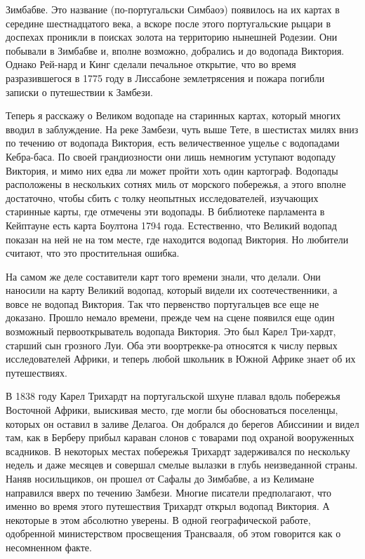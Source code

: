 \documentclass[12pt,a4paper,twoside,openany,svgnames]{memoir}
\begin{document}
Зимбабве. Это название (по-португальски Симбаоэ) появилось на их картах в середине шестнадцатого века, а вскоре после этого португальские рыцари в доспехах проникли в поисках золота на территорию нынешней Родезии. Они побывали в Зимбабве и, вполне возможно, добрались и до водопада Виктория. Однако Рей-нард и Кинг сделали печальное открытие, что во время разразившегося в 1775 году в Лиссабоне землетрясения и пожара погибли записки о путешествии к Замбези.

Теперь я расскажу о Великом водопаде на старинных картах, который многих вводил в заблуждение. На реке Замбези, чуть выше Тете, в шестистах милях вниз по течению от водопада Виктория, есть величественное ущелье с водопадами Кебра-баса. По своей грандиозности они лишь немногим уступают водопаду Виктория, и мимо них едва ли может пройти хоть один картограф. Водопады расположены в нескольких сотнях миль от морского побережья, а этого вполне достаточно, чтобы сбить с толку неопытных исследователей, изучающих старинные карты, где отмечены эти водопады. В библиотеке парламента в Кейптауне есть карта Боултона 1794 года. Естественно, что Великий водопад показан на ней не на том месте, где находится водопад Виктория. Но любители считают, что это простительная ошибка.

На самом же деле составители карт того времени знали, что делали. Они наносили на карту Великий водопад, который видели их соотечественники, а вовсе не водопад Виктория. Так что первенство португальцев все еще не доказано. Прошло немало времени, прежде чем на сцене появился еще один возможный первооткрыватель водопада Виктория. Это был Карел Три-хардт, старший сын грозного Луи. Оба эти воортрекке-ра относятся к числу первых исследователей Африки, и теперь любой школьник в Южной Африке знает об их путешествиях.

В 1838 году Карел Трихардт на португальской шхуне плавал вдоль побережья Восточной Африки, выискивая место, где могли бы обосноваться поселенцы, которых он оставил в заливе Делагоа. Он добрался до берегов Абиссинии и видел там, как в Берберу прибыл караван слонов с товарами под охраной вооруженных всадников. В некоторых местах побережья Трихардт задерживался по нескольку недель и даже месяцев и совершал смелые вылазки в глубь неизведанной страны. Наняв носильщиков, он прошел от Сафалы до Зимбабве, а из Келимане направился вверх по течению Замбези. Многие писатели предполагают, что именно во время этого путешествия Трихардт открыл водопад Виктория. А некоторые в этом абсолютно уверены. В одной географической работе, одобренной министерством просвещения Трансвааля, об этом говорится как о несомненном факте.
\end{document}
